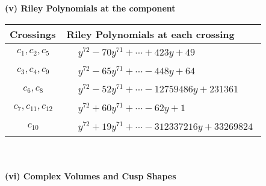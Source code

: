 \documentclass[1p]{elsarticle_modified}
\theoremstyle{definition}
\begin{document}
\newpage\renewcommand{\arraystretch}{1}
\flushleft \textbf{(v) Riley Polynomials at the component}\newline \\
\begin{tabular}{m{50pt}|m{274pt}}
Crossings & \hspace{64pt}Riley Polynomials at each crossing \\
\hline $$\begin{aligned}c_{1},c_{2},c_{5}\end{aligned}$$&$\begin{aligned}
&y^{72}-70 y^{71}+\cdots+423 y+49
\end{aligned}$\\
\hline $$\begin{aligned}c_{3},c_{4},c_{9}\end{aligned}$$&$\begin{aligned}
&y^{72}-65 y^{71}+\cdots-448 y+64
\end{aligned}$\\
\hline $$\begin{aligned}c_{6},c_{8}\end{aligned}$$&$\begin{aligned}
&y^{72}-52 y^{71}+\cdots-12759486 y+231361
\end{aligned}$\\
\hline $$\begin{aligned}c_{7},c_{11},c_{12}\end{aligned}$$&$\begin{aligned}
&y^{72}+60 y^{71}+\cdots-62 y+1
\end{aligned}$\\
\hline $$\begin{aligned}c_{10}\end{aligned}$$&$\begin{aligned}
&y^{72}+19 y^{71}+\cdots-312337216 y+33269824
\end{aligned}$\\
\hline
\end{tabular}\\~\\
\newpage\flushleft \textbf{(vi) Complex Volumes and Cusp Shapes}
\end{document}
